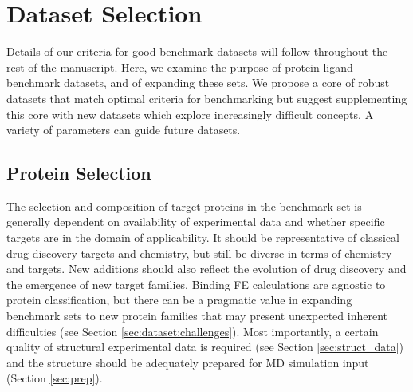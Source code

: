 \documentclass[9pt,bestpractices]{livecoms}
\begin{document}
\section{Dataset Selection}
\label{sec:dataset}

Details of our criteria for good benchmark datasets will follow throughout the rest of the manuscript. Here, we examine the purpose of protein-ligand benchmark datasets, and of expanding these sets.
We propose a core of robust datasets that match optimal criteria for benchmarking but suggest supplementing this core with new datasets which explore increasingly difficult concepts. A variety of parameters can guide future datasets.

\subsection{Protein Selection}
\label{sec:dataset:proteins}
The selection and composition of target proteins in the benchmark set is generally dependent
on availability of experimental data and whether specific targets are in the domain of applicability.
%
It should be representative of classical drug discovery targets and chemistry, but still be diverse in terms of chemistry and targets. New additions should also reflect the evolution of drug discovery and the emergence of new target families.
Binding FE calculations are agnostic to protein classification, but there can be a pragmatic value in
expanding benchmark sets to new protein families that may present unexpected inherent difficulties (see Section \ref{sec:dataset:challenges}).
%
Most importantly, a certain quality of structural experimental data is required (see Section \ref{sec:struct_data})
and the structure should be adequately prepared for MD simulation input (Section \ref{sec:prep}).

\end{document}
